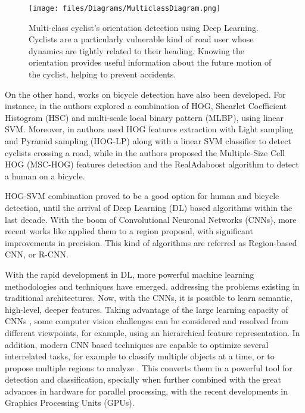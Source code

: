\documentclass[journal]{IEEEtran}
\begin{document}
\begin{figure}[!t]
\centering\texttt{[image: files/Diagrams/MulticlassDiagram.png]}
\caption{Multi-class cyclist's orientation detection using Deep Learning. Cyclists are a particularly vulnerable kind of road user whose dynamics are tightly related to their heading. Knowing the orientation provides useful information about the future motion of the cyclist, helping to prevent accidents.}
\label{fig:0verview}
\end{figure}

On the other hand, works on bicycle detection have also been developed. For instance, in \cite{BycleDetect2015} the authors explored a combination of HOG, Shearlet Coefficient Histogram (HSC) and multi-scale local binary pattern (MLBP), using linear SVM. Moreover, in \cite{CyclistDetCrossing2010} authors used HOG features extraction with Light sampling and Pyramid sampling (HOG-LP) along with a linear SVM classifier to detect cyclists crossing a road, while in \cite{BycleHOG2012} the authors proposed the Multiple-Size Cell HOG (MSC-HOG) features detection and the RealAdaboost algorithm to detect a human on a bicycle. 

HOG-SVM combination proved to be a good option for human and bicycle detection, until the arrival of Deep Learning (DL) based algorithms within the last decade. With the boom of Convolutional Neuronal Networks (CNNs), more recent works like \cite{PedestrianDetect2013,ObjectDetec2014,lan2018pedestrian,chen2019thermal} applied them to a region proposal, with significant improvements in precision. This kind of algorithms are referred as Region-based CNN, or R-CNN.

With the rapid development in DL, more powerful machine learning methodologies and techniques have emerged, addressing the problems existing in traditional architectures. Now, with the CNNs, it is possible to learn semantic, high-level, deeper features. Taking advantage of the large learning capacity of CNNs \cite{zhao2019object}, some computer vision challenges can be considered and resolved from different viewpoints, for example, using an hierarchical feature representation. In addition, modern CNN based techniques are capable to optimize several interrelated tasks, for example to classify multiple objects at a time, or to propose multiple regions to analyze \cite{zhao2019object}. This converts them in a powerful tool for detection and classification, specially when further combined with the great advances in hardware for parallel processing, with the recent developments in Graphics Processing Units (GPUs).
\end{document}
